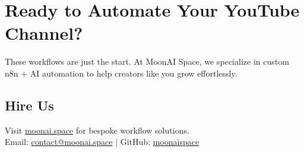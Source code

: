 \documentclass[a4paper,10pt]{article}
\begin{document}
\section*{Ready to Automate Your YouTube Channel?}
\color{spacewhite}
These workflows are just the start. At MoonAI Space, we specialize in custom n8n + AI automation to help creators like you grow effortlessly.

\subsection*{Hire Us}
\begin{center}
Visit \href{https://moonai.space}{moonai.space} for bespoke workflow solutions. \\
Email: \href{mailto:contact@moonai.space}{contact@moonai.space} | GitHub: \href{https://github.com/moonaispace}{moonaispace}
\end{center}
\end{document}
